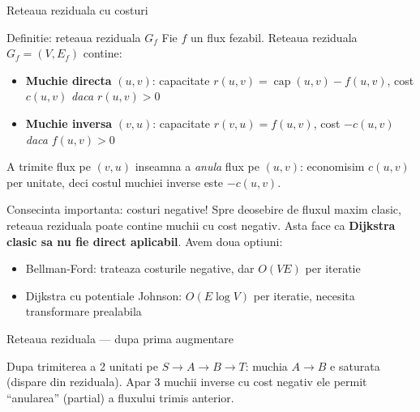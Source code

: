 ﻿\documentclass[9pt]{beamer}
\newcommand{\capop}{\operatorname{cap}}
\begin{document}
\begin{frame}[shrink]{Reteaua reziduala cu costuri}
  \begin{block}{Definitie: reteaua reziduala $G_f$}
    Fie $f$ un flux fezabil. Reteaua reziduala $G_f=(V,E_f)$ contine:
    \begin{itemize}
      \item \textbf{Muchie directa} $(u,v)$: capacitate $r(u,v)=\capop(u,v)-f(u,v)$,
            cost $c(u,v)$ \textemdash{} \textit{daca} $r(u,v)>0$
      \item \textbf{Muchie inversa} $(v,u)$: capacitate $r(v,u)=f(u,v)$,
            cost $-c(u,v)$ \textemdash{} \textit{daca} $f(u,v)>0$
    \end{itemize}
    A trimite flux pe $(v,u)$ inseamna a \textit{anula} flux pe $(u,v)$: economisim $c(u,v)$ per
    unitate, deci costul muchiei inverse este $-c(u,v)$.
  \end{block}
  \begin{alertblock}{Consecinta importanta: costuri negative!}
    Spre deosebire de fluxul maxim clasic, reteaua reziduala poate contine muchii cu
    \alert{cost negativ}. Asta face ca \textbf{Dijkstra clasic sa nu fie direct aplicabil}.
    Avem doua optiuni:
    \begin{itemize}\footnotesize
      \item Bellman-Ford: trateaza costurile negative, dar $O(VE)$ per iteratie
      \item Dijkstra cu potentiale Johnson: $O(E\log V)$ per iteratie, necesita transformare prealabila
    \end{itemize}
  \end{alertblock}
\end{frame}

\begin{frame}[shrink]{Reteaua reziduala --- dupa prima augmentare}
  \begin{center}
  \end{center}
  \begin{block}{}
    \footnotesize
    Dupa trimiterea a 2 unitati pe $S\!\to\!A\!\to\!B\!\to\!T$:
    muchia $A\!\to\!B$ e saturata (dispare din reziduala).
    Apar 3 muchii inverse cu \alert{cost negativ} \textemdash{}
    ele permit ``anularea'' (partial) a fluxului trimis anterior.
  \end{block}
\end{frame}
\end{document}
